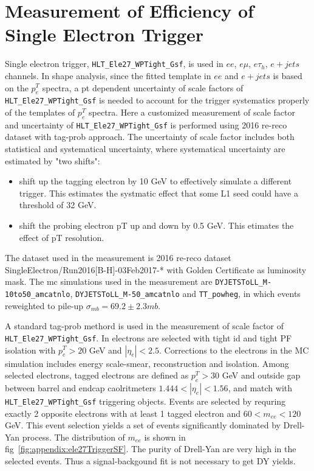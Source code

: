 
\section{Measurement of Efficiency of Single Electron Trigger}

Single electron trigger, \texttt{HLT\_Ele27\_WPTight\_Gsf}, is used in $ee$, $e\mu$, $e\tau_h$, $e+jets$ channels.
In shape analysis, since the fitted template in $ee$ and $e+jets$ is based on the $p^T_e$ spectra, a pt dependent 
uncertainty of scale factors of \texttt{HLT\_Ele27\_WPTight\_Gsf} is needed to account for the trigger 
systematics properly of the templates of $p^T_e$ spectra. Here a customized measurement of scale factor and uncertainty
of \texttt{HLT\_Ele27\_WPTight\_Gsf} is performed using 2016 re-reco dataset with tag-prob approach. The uncertainty
of scale factor includes both statistical and systematical uncertainty, where systematical uncertainty are estimated by
"two shifts":

\begin{itemize}
  \item shift up the tagging electron by 10 GeV to effectively simulate a different trigger. This estimates the 
  systmatic effect that some L1 seed could have a threshold of 32 GeV.
  \item shift the probing electron pT up and down by 0.5 GeV. This etimates the effect of pT resolution.
\end{itemize}

The dataset used in the measurement is 2016 re-reco dataset SingleElectron/Run2016[B-H]-03Feb2017-*
with Golden Certificate as luminosity mask. The mc simulations used in the measurement are \texttt{DYJETSToLL\_M-10to50\_amcatnlo},
\texttt{DYJETSToLL\_M-50\_amcatnlo} and \texttt{TT\_powheg}, in which events reweighted to pile-up $\sigma_{mb} = 69.2\pm 2.3 mb$.

A standard tag-prob methord is used in the measurement of scale factor of \texttt{HLT\_Ele27\_WPTight\_Gsf}.
In electrons are selected with tight id and tight PF isolation with $p^T_e>20$ GeV and $|\eta_e|<2.5$. Corrections
to the electrons in the MC simulation includes energy scale-smear, reconstruction and isolation. Among selected electrons, tagged electrons
are defined as $p^T_e>30$ GeV and outside gap between barrel and endcap caolritmeters $1.444<|\eta_e|<1.56$, and 
match with \texttt{HLT\_Ele27\_WPTight\_Gsf} triggering objects. Events are selected by requring exactly 2
opposite electrons with at least 1 tagged electron and $60<m_{ee}<120$ GeV. This event selection yields a set of events 
significantly dominated by Drell-Yan process. The distribution of $m_{ee}$ is shown in fig~\ref{fig:appendix:ele27TriggerSF}.
The purity of Drell-Yan are very high in the selected events. Thus a signal-backgound fit is not necessary to get DY yields.




